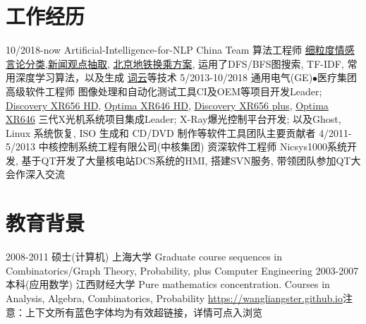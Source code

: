 \documentclass[letterpaper,10pt]{Resume_Liang}
\begin{document}
\begin{body}
\section{工作经历}
\begin{entrylist}
  \entry
    {10/2018-now}
    {Artificial-Intelligence-for-NLP China Team}
    {算法工程师}
    {\href{https://github.com/Artificial-Intelligence-for-NLP-and-CV/comment-setimental-classification}{细粒度情感言论分类},\href{https://github.com/wangliangster/TestWL/blob/master/ViewPointExtract.ipynb}{新闻观点抽取}, \href{https://github.com/wangliangster/NLP-Course/blob/master/BeijingSubway.ipynb}{北京地铁换乘方案}, 运用了DFS/BFS图搜索, TF-IDF, 常用深度学习算法，以及生成 \href{https://github.com/wangliangster/TestWL/blob/master/wordcloudLiang.ipynb}{词云}等技术 }	
  \entry
    {5/2013-10/2018}
    {通用电气(GE)$\bullet$医疗集团}
    {高级软件工程师}
    {图像处理和自动化测试工具CI及OEM等项目开发Leader; \href{https://www.gehealthcare.com/en/products/radiography/fixed-rad-systems/discovery-xr656-hd-x-ray-system-powered-by-helix}{Discovery XR656 HD}, \href{https://www.gehealthcare.com/en/products/radiography/fixed-rad-systems/optima-xr646-hd-x-ray-system-powered-by-helix}{Optima XR646 HD}, \href{https://www.gehealthcare.com/en/products/radiography/fixed-rad-systems/discovery-xr656-plus}{Discovery XR656 plus}, \href{https://www.gehealthcare.com/en/products/radiography/fixed-rad-systems/optima-xr646}{Optima XR646} 三代X光机系统项目集成Leader; X-Ray爆光控制平台开发; 以及Ghost, Linux 系统恢复, ISO 生成和 CD/DVD 制作等软件工具团队主要贡献者}
  \entry
    {4/2011-5/2013}
    {中核控制系统工程有限公司(中核集团)}
    {资深软件工程师}
    {Nicsys1000系统开发, 基于QT开发了大量核电站DCS系统的HMI, 搭建SVN服务, 带领团队参加QT大会作深入交流}
\end{entrylist}

\section{教育背景}
\begin{entrylist}
  \entry
    {2008-2011}
    {硕士(计算机)}
    {上海大学}
    {Graduate course sequences in Combinatorics/Graph Theory, Probability, plus Computer Engineering}
  \entry
    {2003-2007}
    {本科(应用数学)}
    {江西财经大学}
    {Pure mathematics concentration. Courses in Analysis, Algebra, Combinatorics, Probability}
   {\href{https://wangliangster.github.io}{https://wangliangster.github.io}}{注意：上下文所有蓝色字体均为有效超链接，详情可点入浏览}{}
\end{entrylist}


\end{body}
\end{document}
